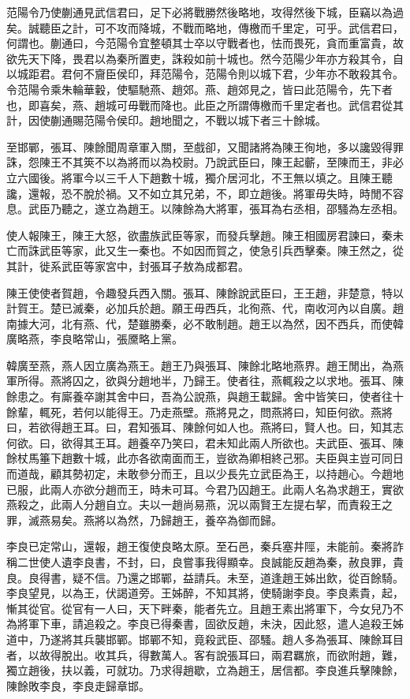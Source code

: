 范陽令乃使蒯通見武信君曰，足下必將戰勝然後略地，攻得然後下城，臣竊以為過矣。誠聽臣之計，可不攻而降城，不戰而略地，傳檄而千里定，可乎。武信君曰，何謂也。蒯通曰，今范陽令宜整頓其士卒以守戰者也，怯而畏死，貪而重富貴，故欲先天下降，畏君以為秦所置吏，誅殺如前十城也。然今范陽少年亦方殺其令，自以城距君。君何不齎臣侯印，拜范陽令，范陽令則以城下君，少年亦不敢殺其令。令范陽令乘朱輪華轂，使驅馳燕、趙郊。燕、趙郊見之，皆曰此范陽令，先下者也，即喜矣，燕、趙城可毋戰而降也。此臣之所謂傳檄而千里定者也。武信君從其計，因使蒯通賜范陽令侯印。趙地聞之，不戰以城下者三十餘城。

至邯鄲，張耳、陳餘聞周章軍入關，至戲卻，又聞諸將為陳王徇地，多以讒毀得罪誅，怨陳王不其筴不以為將而以為校尉。乃說武臣曰，陳王起蘄，至陳而王，非必立六國後。將軍今以三千人下趙數十城，獨介居河北，不王無以填之。且陳王聽讒，還報，恐不脫於禍。又不如立其兄弟，不，即立趙後。將軍毋失時，時閒不容息。武臣乃聽之，遂立為趙王。以陳餘為大將軍，張耳為右丞相，邵騷為左丞相。

使人報陳王，陳王大怒，欲盡族武臣等家，而發兵擊趙。陳王相國房君諫曰，秦未亡而誅武臣等家，此又生一秦也。不如因而賀之，使急引兵西擊秦。陳王然之，從其計，徙系武臣等家宮中，封張耳子敖為成都君。

陳王使使者賀趙，令趣發兵西入關。張耳、陳餘說武臣曰，王王趙，非楚意，特以計賀王。楚已滅秦，必加兵於趙。願王毋西兵，北徇燕、代，南收河內以自廣。趙南據大河，北有燕、代，楚雖勝秦，必不敢制趙。趙王以為然，因不西兵，而使韓廣略燕，李良略常山，張黡略上黨。

韓廣至燕，燕人因立廣為燕王。趙王乃與張耳、陳餘北略地燕界。趙王閒出，為燕軍所得。燕將囚之，欲與分趙地半，乃歸王。使者往，燕輒殺之以求地。張耳、陳餘患之。有廝養卒謝其舍中曰，吾為公說燕，與趙王載歸。舍中皆笑曰，使者往十餘輩，輒死，若何以能得王。乃走燕壁。燕將見之，問燕將曰，知臣何欲。燕將曰，若欲得趙王耳。曰，君知張耳、陳餘何如人也。燕將曰，賢人也。曰，知其志何欲。曰，欲得其王耳。趙養卒乃笑曰，君未知此兩人所欲也。夫武臣、張耳、陳餘杖馬箠下趙數十城，此亦各欲南面而王，豈欲為卿相終己邪。夫臣與主豈可同日而道哉，顧其勢初定，未敢參分而王，且以少長先立武臣為王，以持趙心。今趙地已服，此兩人亦欲分趙而王，時未可耳。今君乃囚趙王。此兩人名為求趙王，實欲燕殺之，此兩人分趙自立。夫以一趙尚易燕，況以兩賢王左提右挈，而責殺王之罪，滅燕易矣。燕將以為然，乃歸趙王，養卒為御而歸。

李良已定常山，還報，趙王復使良略太原。至石邑，秦兵塞井陘，未能前。秦將詐稱二世使人遺李良書，不封，曰，良嘗事我得顯幸。良誠能反趙為秦，赦良罪，貴良。良得書，疑不信。乃還之邯鄲，益請兵。未至，道逢趙王姊出飲，從百餘騎。李良望見，以為王，伏謁道旁。王姊醉，不知其將，使騎謝李良。李良素貴，起，慚其從官。從官有一人曰，天下畔秦，能者先立。且趙王素出將軍下，今女兒乃不為將軍下車，請追殺之。李良已得秦書，固欲反趙，未決，因此怒，遣人追殺王姊道中，乃遂將其兵襲邯鄲。邯鄲不知，竟殺武臣、邵騷。趙人多為張耳、陳餘耳目者，以故得脫出。收其兵，得數萬人。客有說張耳曰，兩君羈旅，而欲附趙，難，獨立趙後，扶以義，可就功。乃求得趙歇，立為趙王，居信都。李良進兵擊陳餘，陳餘敗李良，李良走歸章邯。

